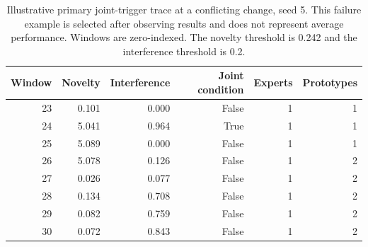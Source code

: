 \begin{table}[t]
\caption{Illustrative primary joint-trigger trace at a conflicting change, seed 5. This failure example is selected after observing results and does not represent average performance. Windows are zero-indexed. The novelty threshold is 0.242 and the interference threshold is 0.2.}
\label{tab:trace}
\centering\small
\begin{tabular}{rrrrrr}
\toprule Window & Novelty & Interference & Joint condition & Experts & Prototypes\\\midrule
23 & 0.101 & 0.000 & False & 1 & 1 \\
24 & 5.041 & 0.964 & True & 1 & 1 \\
25 & 5.089 & 0.000 & False & 1 & 1 \\
26 & 5.078 & 0.126 & False & 1 & 2 \\
27 & 0.026 & 0.077 & False & 1 & 2 \\
28 & 0.134 & 0.708 & False & 1 & 2 \\
29 & 0.082 & 0.759 & False & 1 & 2 \\
30 & 0.072 & 0.843 & False & 1 & 2 \\
\bottomrule\end{tabular}
\end{table}